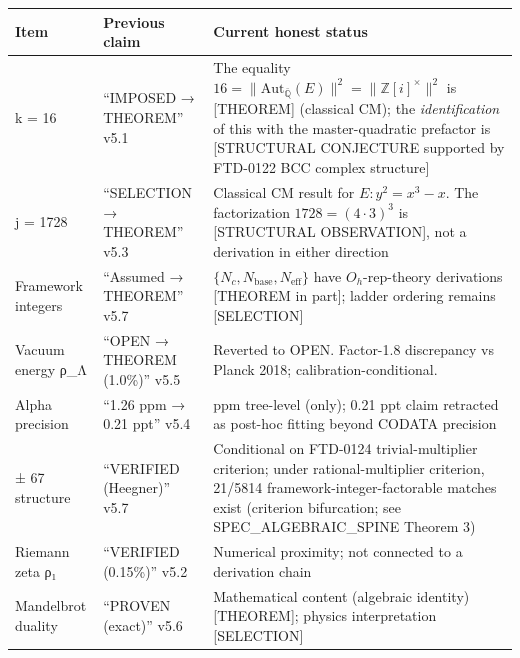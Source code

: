 \documentclass[
  11pt,
  letterpaper,
  twoside,
  openright]{book}
\begin{document}
\begin{longtable}[]{@{}
  >{\raggedright\arraybackslash}p{}
  >{\raggedright\arraybackslash}p{}
  >{\raggedright\arraybackslash}p{}@{}}
\toprule\noalign{}
\begin{minipage}[b]{\linewidth}\raggedright
Item
\end{minipage} & \begin{minipage}[b]{\linewidth}\raggedright
Previous claim
\end{minipage} & \begin{minipage}[b]{\linewidth}\raggedright
Current honest status
\end{minipage} \\
\midrule\noalign{}
\endhead
\bottomrule\noalign{}
\endlastfoot
k = 16 & ``IMPOSED → THEOREM'' v5.1 & The equality
\(16 = \|\mathrm{Aut}_{\bar{\mathbb{Q}}}(E)\|^2 = \|\mathbb{Z}[i]^\times\|^2\)
is {[}THEOREM{]} (classical CM); the \emph{identification} of this with
the master-quadratic prefactor is {[}STRUCTURAL CONJECTURE supported by
FTD-0122 BCC complex structure{]} \\
j = 1728 & ``SELECTION → THEOREM'' v5.3 & Classical CM result for
\(E: y^2 = x^3 - x\). The factorization \(1728 = (4 \cdot 3)^3\) is
{[}STRUCTURAL OBSERVATION{]}, not a derivation in either direction \\
Framework integers & ``Assumed → THEOREM'' v5.7 &
\(\{N_c, N_\mathrm{base}, N_\mathrm{eff}\}\) have \(O_h\)-rep-theory
derivations {[}THEOREM in part{]}; ladder ordering remains
{[}SELECTION{]} \\
Vacuum energy ρ\_Λ & ``OPEN → THEOREM (1.0\%)'' v5.5 & Reverted to OPEN.
Factor-1.8 discrepancy vs Planck 2018; calibration-conditional. \\
Alpha precision & ``1.26 ppm → 0.21 ppt'' v5.4 & 1.26 ppm tree-level
(only); 0.21 ppt claim retracted as post-hoc fitting beyond CODATA
precision \\
70 ± 67 structure & ``VERIFIED (Heegner)'' v5.7 & Conditional on
FTD-0124 trivial-multiplier criterion; under rational-multiplier
criterion, 21/5814 framework-integer-factorable matches exist (criterion
bifurcation; see SPEC\_ALGEBRAIC\_SPINE Theorem 3) \\
Riemann zeta ρ₁ & ``VERIFIED (0.15\%)'' v5.2 & Numerical proximity; not
connected to a derivation chain \\
Mandelbrot duality & ``PROVEN (exact)'' v5.6 & Mathematical content
(algebraic identity) {[}THEOREM{]}; physics interpretation
{[}SELECTION{]} \\
\end{longtable}
\end{document}
